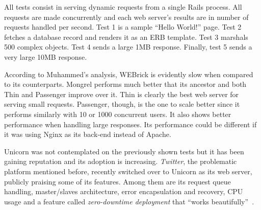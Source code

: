 All tests consist in serving dynamic requests from a single Rails process. All requests are made concurrently and each web server's results are in number of requests handled per second. Test 1 is a sample ``Hello World!'' page. Test 2 fetches a database record and renders it as an ERB template. Test 3 marshals 500 complex objects. Test 4 sends a large 1MB response. Finally, test 5 sends a very large 10MB response.

According to Muhammed's analysis, WEBrick is evidently slow when compared to its counterparts. Mongrel performs much better that its ancestor and both Thin and Passenger improve over it. Thin is clearly the best web server for serving small requests. Passenger, though, is the one to scale better since it performs similarly with 10 or 1000 concurrent users. It also shows better performance when handling large responses. Its performance could be different if it was using Nginx as its back-end instead of Apache.

Unicorn was not contemplated on the previously shown tests but it has been gaining reputation and its adoption is increasing. \textit{Twitter}, the problematic platform mentioned before, recently switched over to Unicorn as its web server, publicly praising some of its features. Among them are its request queue handling, master/slaves architecture, error encapsulation and recovery, CPU usage and a feature called \textit{zero-downtime deployment} that ``works beautifully''~\cite{twitter_unicorn}.

